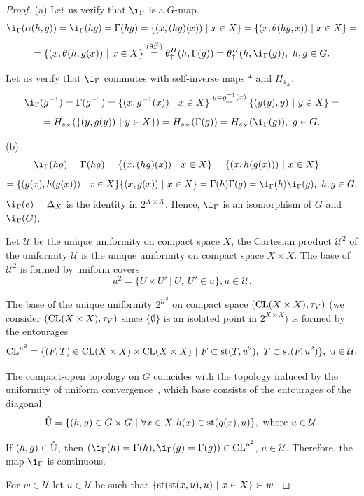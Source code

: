 \documentclass{amsart}
\newcommand{\st}{\mbox{{\rm st}}}
\newcommand{\CL}{\mbox{{\rm CL}}}
\begin{document}
\begin{proof} 
(a) Let us verify that $\i_{\Gamma}$ is a $G$-map. 
$$\i_{\Gamma} (\alpha (h, g))=\i_{\Gamma} (hg)=\Gamma (hg)=\{(x, (hg)(x))\ |\ x\in X\}=\{(x, \theta (hg, x))\ |\ x\in X\}=$$
$$=\{(x, \theta (h, g(x))\ |\ x\in X\}\stackrel{(\theta^H_{\uparrow})}{=}\theta^H_{\uparrow} (h, \Gamma (g))=\theta^H_{\uparrow} (h, \i_{\Gamma} (g)),\ h, g\in G.$$

Let us verify that $\i_{\Gamma}$ commutes with self-inverse maps $*$ and $H_{s_X}$.
$$\i_{\Gamma} (g^{-1})=\Gamma (g^{-1})=\{(x, g^{-1}(x))\ |\ x\in X\}\stackrel{y=g^{-1}(x)}{=}\{(g(y), y)\ |\ y\in X\}=$$
$$=H_{s_X}(\{(y, g(y))\ |\ y\in X\})=H_{s_X}(\Gamma (g))=H_{s_X}(\i_{\Gamma} (g)),\ g\in G.$$

(b)  
$$\i_{\Gamma} (hg)=\Gamma (hg)=\{(x, (hg)(x))\ |\ x\in X\}=\{(x,  h(g(x)))\ |\ x\in X\}=$$
$$=\{(g(x), h(g(x)))\ |\ x\in X\}\{(x, g(x))\ |\ x\in X\}=\Gamma (h)\Gamma (g)=\i_{\Gamma} (h)\i_{\Gamma} (g),\ h, g\in G,$$
$\i_{\Gamma}(e)=\Delta_X$ is the identity in $2^{X\times X}$. Hence, $\i_{\Gamma}$ is an isomorphism of $G$ and $\i_{\Gamma}(G)$.

Let $\mathcal U$ be the unique uniformity on compact space $X$, the Cartesian product $\mathcal U^2$ of the uniformity $\mathcal U$ is the unique uniformity on compact space $X\times X$. The base of $\mathcal U^2$ is formed by uniform covers 
$$u^2=\{U\times U'\ |\ U,\ U'\in u\}, u\in\mathcal U.$$

The base of the unique uniformity $2^{\mathcal U^2}$ on compact space $(\CL (X\times X), \tau_V)$ (we consider $(\CL (X\times X), \tau_V)$ since $\{\emptyset\}$ is an isolated point in $2^{X\times X}$) is formed by the entourages 
$$\CL^{u^2}=\{(F, T)\in \CL (X\times X)\times \CL (X\times X)\ |\ F\subset \st (T, u^2),\  T\subset \st (F, u^2)\},\ u\in\mathcal U.$$

The compact-open topology on $G$ coincides with the topology induced by the uniformity of uniform  convergence~\cite[Ch.\ 8, \S\ 8.2, Corollary 8.2.7]{Engelking}, which base consists of the entourages of the diagonal 
$$\hat {\rm U}=\{(h, g)\in G\times G\ |\ \forall x\in X\ h(x)\in\st (g(x), u)\},\ \mbox {where}\ u\in\mathcal U.$$

If $(h, g)\in \hat {\rm U}$, then $(\i_{\Gamma} (h)=\Gamma (h), \i_{\Gamma}(g)=\Gamma (g))\in\CL^{u^2}$, $u\in\mathcal U$. Therefore, the map $\i_{\Gamma}$ is continuous.

For $w\in\mathcal U$ let $u\in\mathcal U$ be such that $\{\st (\st (x, u), u)\ |\ x\in X\}\succ w$. 


\end{proof}
\end{document}
